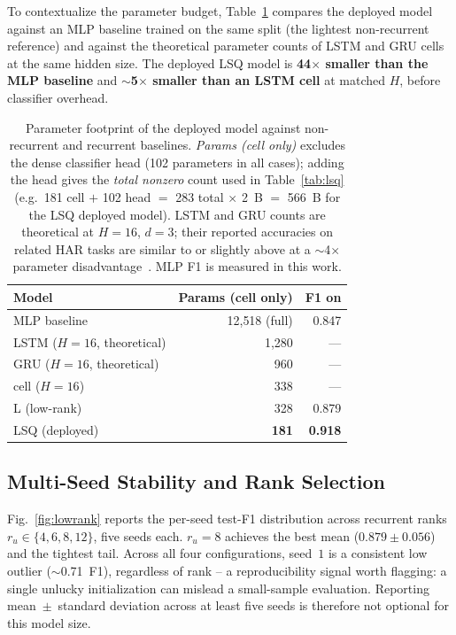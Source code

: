 To contextualize the parameter budget, Table~\ref{tab:baselines}
compares the deployed model against an MLP baseline trained on the
same \hapt{} split (the lightest non-recurrent reference) and
against the theoretical parameter counts of LSTM and GRU cells at
the same hidden size. The deployed \fastgrnn{} LSQ model is
\textbf{44$\times$ smaller than the MLP baseline} and
\textbf{$\sim$5$\times$ smaller than an LSTM cell} at matched $H$,
before classifier overhead.

\begin{table}[t]
\centering
\caption{Parameter footprint of the deployed model against
non-recurrent and recurrent baselines.
\emph{Params (cell only)} excludes the dense classifier head
(102 parameters in all cases); adding the head gives the
\emph{total nonzero} count used in Table~\ref{tab:lsq}
(e.g.\ 181 cell $+$ 102 head $=$ 283 total $\times$ 2~B $=$ 566~B
for the LSQ deployed model). LSTM and GRU counts are theoretical
at $H{=}16$, $d{=}3$; their reported accuracies on related HAR
tasks are similar to or slightly above \fastgrnn{} at a
$\sim$4$\times$ parameter
disadvantage~\cite{kusupati2018fastgrnn}. MLP F1 is measured
in this work.}
\label{tab:baselines}
\begin{tabular}{lrr}
\toprule
Model & Params (cell only) & F1 on \hapt{} \\
\midrule
MLP baseline                  & 12{,}518 (full)  & 0.847 \\
LSTM ($H{=}16$, theoretical)  & 1{,}280          & --- \\
GRU ($H{=}16$, theoretical)   & 960              & --- \\
\fastgrnn{} cell ($H{=}16$)   & 338              & --- \\
\fastgrnn{} L (low-rank)      & 328              & 0.879 \\
\fastgrnn{} LSQ (deployed)    & \textbf{181}     & \textbf{0.918} \\
\bottomrule
\end{tabular}
\end{table}

\subsection{Multi-Seed Stability and Rank Selection}
\label{sec:results:lowrank}

Fig.~\ref{fig:lowrank} reports the per-seed test-F1 distribution
across recurrent ranks $r_u \in \{4, 6, 8, 12\}$, five seeds each.
$r_u{=}8$ achieves the best mean ($0.879 \pm 0.056$) and the
tightest tail. Across all four configurations, seed~$1$ is a
consistent low outlier ($\sim$0.71~F1), regardless of rank --
a reproducibility signal worth flagging: a single unlucky
initialization can mislead a small-sample evaluation. Reporting
mean~$\pm$~standard deviation across at least five seeds is
therefore not optional for this model size.

